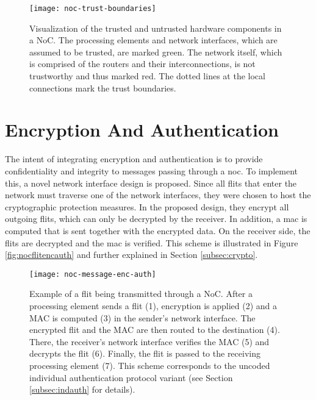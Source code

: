 \begin{figure}
    \centering
    \texttt{[image: noc-trust-boundaries]}
    \caption[Trust boundaries in a NoC]{Visualization of the trusted and untrusted hardware components in a NoC. The processing elements and network
    interfaces, which are assumed to be trusted, are marked green. The network itself, which is comprised of the routers and their interconnections,
    is not trustworthy and thus marked red. The dotted lines at the local connections mark the trust boundaries.}
    \label{fig:noctrustboundaries}
\end{figure}

\section{Encryption And Authentication}\label{sec:encandauth}
The intent of integrating encryption and authentication is to provide confidentiality and integrity to messages passing through a \gls{noc}. To
implement this, a novel network interface design is proposed. Since all flits that enter the network must traverse one of the network interfaces,
they were chosen to host the cryptographic protection measures. In the proposed design, they encrypt all outgoing flits, which can only be decrypted by the
receiver. In addition, a \gls{mac} is computed that is sent together with the encrypted data. On the receiver side, the flits are decrypted and the
\gls{mac} is verified. This scheme is illustrated in Figure \vref{fig:nocflitencauth} and further explained in Section \ref{subsec:crypto}.

\begin{figure}
    \centering
    \texttt{[image: noc-message-enc-auth]}
    \caption[Flit traversing a NoC with encryption and authentication]{Example of a flit being transmitted through a NoC. After a processing element sends a flit (1),
    encryption is applied (2) and a MAC is computed (3) in the sender's network interface. The encrypted flit and the MAC are then routed to the
    destination (4). There, the receiver's network interface verifies the MAC (5) and decrypts the flit (6). Finally, the flit is passed to the
    receiving processing element (7). This scheme corresponds to the uncoded individual authentication protocol variant (see Section
    \ref{subsec:indauth} for details).}
    \label{fig:nocflitencauth}
\end{figure}

